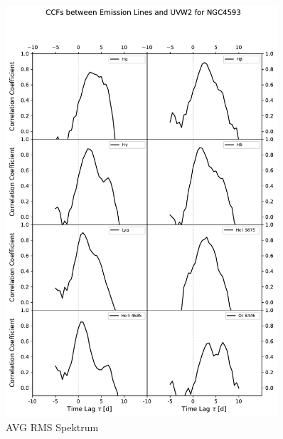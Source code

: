 \begin{figure}[!ht]
	\centering
	\includegraphics[width=0.9\textwidth]{pictures/Chapter4/ccfs/CCFs_H_He_LyA_O_UVW2.pdf}
	\caption{AVG RMS Spektrum}
	\label{fig:ccfs}
\end{figure}


